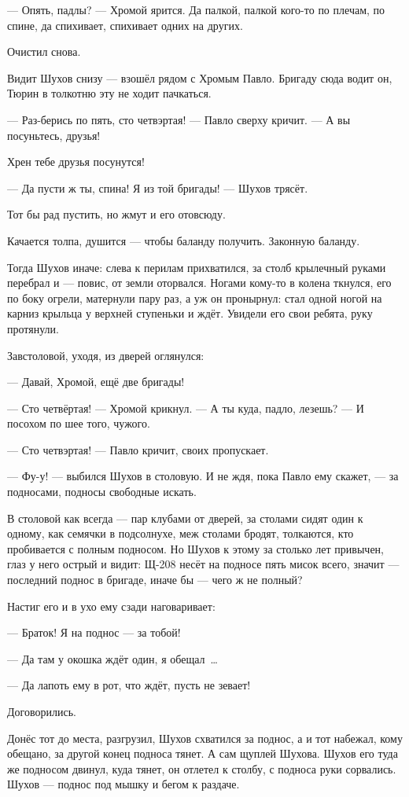--- Опять, падлы? --- Хромой ярится. Да палкой, палкой кого-то по плечам, по спине, да спихивает, 
спихивает одних на других.

Очистил снова.

Видит Шухов снизу --- взошёл рядом с Хромым Павло. Бригаду сюда водит он, Тюрин в толкотню эту 
не ходит пачкаться.

--- Раз-берись по пять, сто четвэртая! --- Павло сверху кричит. --- А вы посуньтесь, друзья!

Хрен тебе друзья посунутся!

--- Да пусти ж ты, спина! Я из той бригады! --- Шухов трясёт.

Тот бы рад пустить, но жмут и его отовсюду.

Качается толпа, душится --- чтобы баланду получить. Законную баланду.

Тогда Шухов иначе: слева к перилам прихватился, за столб крылечный руками перебрал и --- 
повис, от земли оторвался. Ногами кому-то в колена ткнулся, его по боку огрели, матернули пару 
раз, а уж он пронырнул: стал одной ногой на карниз крыльца у верхней ступеньки и ждёт. Увидели 
его свои ребята, руку протянули.

Завстоловой, уходя, из дверей оглянулся:

--- Давай, Хромой, ещё две бригады!

--- Сто четвёртая! --- Хромой крикнул. --- А ты куда, падло, лезешь? --- И посохом по шее того, чужого.

--- Сто четвэртая! --- Павло кричит, своих пропускает.

--- Фу-у! --- выбился Шухов в столовую. И не ждя, пока Павло ему скажет, --- за подносами, подносы 
свободные искать.

В столовой как всегда --- пар клубами от дверей, за столами сидят один к одному, как семячки в 
подсолнухе, меж столами бродят, толкаются, кто пробивается с полным подносом. Но Шухов к 
этому за столько лет привычен, глаз у него острый и видит: Щ-208 несёт на подносе пять мисок 
всего, значит --- последний поднос в бригаде, иначе бы --- чего ж не полный?

Настиг его и в ухо ему сзади наговаривает:

--- Браток! Я на поднос --- за тобой!

--- Да там у окошка ждёт один, я обещал~\dots{}

--- Да лапоть ему в рот, что ждёт, пусть не зевает!

Договорились.

Донёс тот до места, разгрузил, Шухов схватился за поднос, а и тот набежал, кому обещано, за 
другой конец подноса тянет. А сам щуплей Шухова. Шухов его туда же подносом двинул, куда 
тянет, он отлетел к столбу, с подноса руки сорвались. Шухов --- поднос под мышку и бегом к 
раздаче.

